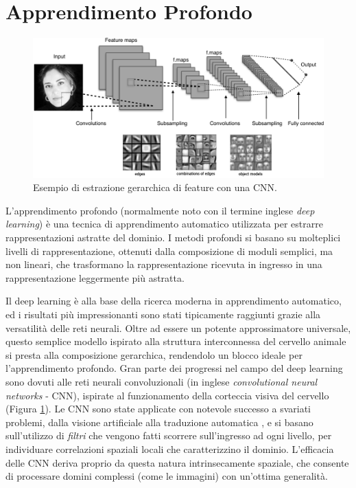 \section*{Apprendimento Profondo}
%
\begin{figure}[t]
    \includegraphics[width=\textwidth]{pictures/abs_cnn}
    \centering
    \caption[Esempio di estrazione di feature con una CNN]{Esempio
	    di estrazione gerarchica di feature con una CNN.}
    \label{f:abs_cnn}
\end{figure}
%
L'apprendimento profondo (normalmente noto con il termine inglese 
\textit{deep learning}) \`e una tecnica di apprendimento automatico utilizzata
per estrarre rappresentazioni astratte del dominio. 
I metodi profondi si basano su molteplici livelli di rappresentazione,
ottenuti dalla composizione di moduli semplici, ma non lineari, che trasformano 
la rappresentazione ricevuta in ingresso in una rappresentazione leggermente 
pi\`u astratta. 

Il deep learning \`e alla base della ricerca moderna in 
apprendimento automatico, ed i risultati pi\`u impressionanti sono stati 
tipicamente raggiunti grazie alla versatilit\`a delle reti neurali.
Oltre ad essere un potente approssimatore universale, questo semplice modello 
ispirato alla struttura interconnessa del cervello animale si presta alla 
composizione gerarchica, rendendolo un blocco ideale per l'apprendimento 
profondo.
Gran parte dei progressi nel campo del deep learning sono dovuti alle reti 
neurali convoluzionali (in inglese \textit{convolutional neural networks} - CNN), 
ispirate al funzionamento della corteccia visiva del cervello (Figura \ref{f:abs_cnn}). 
Le CNN sono state applicate con notevole successo a svariati problemi, dalla 
visione artificiale \cite{krizhevsky2012imagenet, szegedy2015going} alla 
traduzione automatica \cite{wu2016google}, e si basano sull'utilizzo di 
\textit{filtri} che vengono fatti scorrere sull'ingresso ad ogni livello, per 
individuare correlazioni spaziali locali che caratterizzino il dominio. 
L'efficacia delle CNN deriva proprio da questa natura intrinsecamente spaziale, 
che consente di processare domini complessi (come le immagini) con un'ottima 
generalit\`a.

